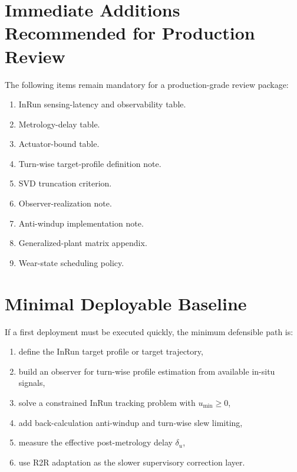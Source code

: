 \documentclass[11pt,a4paper]{article}
\begin{document}
\section{Immediate Additions Recommended for Production Review}
The following items remain mandatory for a production-grade review package:
\begin{enumerate}[leftmargin=1.7em]
\item InRun sensing-latency and observability table.
\item Metrology-delay table.
\item Actuator-bound table.
\item Turn-wise target-profile definition note.
\item SVD truncation criterion.
\item Observer-realization note.
\item Anti-windup implementation note.
\item Generalized-plant matrix appendix.
\item Wear-state scheduling policy.
\end{enumerate}

\section{Minimal Deployable Baseline}
If a first deployment must be executed quickly, the minimum defensible path is:
\begin{enumerate}[leftmargin=1.7em]
\item define the InRun target profile or target trajectory,
\item build an observer for turn-wise profile estimation from available in-situ signals,
\item solve a constrained InRun tracking problem with $u_{\min}\ge 0$,
\item add back-calculation anti-windup and turn-wise slew limiting,
\item measure the effective post-metrology delay $\delta_u$,
\item use R2R adaptation as the slower supervisory correction layer.
\end{enumerate}
\end{document}
